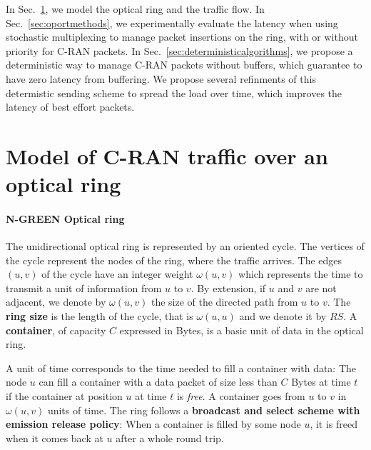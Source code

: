 \documentclass[]{llncs}
\begin{document}
In Sec.~\ref{sec:model}, we model the optical ring and the traffic flow. In Sec.~\ref{sec:oportmethods}, we experimentally evaluate the latency when using stochastic multiplexing to manage packet insertions on the ring, with or without priority for C-RAN packets. In Sec.~\ref{sec:deterministicalgorithms}, we propose a deterministic way to manage C-RAN packets without buffers, which guarantee to have zero latency from buffering. We propose several refinments of this determistic sending scheme to spread the load over time, which improves the latency of best effort packets.

\section{Model of C-RAN traffic over an optical ring}
\label{sec:model}
    
  \paragraph{N-GREEN Optical ring}
   
  The unidirectional optical ring is represented by an oriented cycle. The vertices of the cycle represent the nodes of the ring, where the traffic arrives. The edges $(u,v)$ of the cycle have an integer weight $\omega(u,v)$ which represents the time to transmit a unit of information from $u$ to $v$. By extension, if $u$ and $v$ are not adjacent, we denote by $\omega(u,v)$ the size of the directed path from $u$ to $v$.  The \textbf{ring size} is the length of the cycle, that is $\omega(u,u)$ and we denote it by $RS$. A {\bf container}, of capacity $C$  expressed in Bytes, is a basic unit of data in the optical ring. 
  
  A unit of time corresponds to the time needed to fill a container with data:
  The node $u$ can fill a container with a data packet of size less than $C$ Bytes at time $t$ if the container 
  at position $u$ at time $t$ is \emph{free}. A container goes from $u$ to $v$ in $\omega(u,v)$ units of time. The ring follows a {\bf broadcast and select scheme with emission release policy}: When a container is filled by some node $u$, it is freed when it comes back at $u$ after a whole round trip.
  
\end{document}
